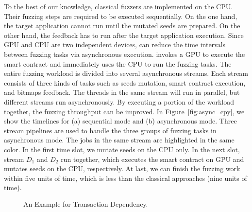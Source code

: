 To the best of our knowledge, classical fuzzers are implemented on the CPU. 
Their fuzzing steps are required to be executed sequentially.
On the one hand, the target application cannot run until the mutated seeds are prepared. 
On the other hand, the feedback has to run after the target application execution. 
%
Since GPU and CPU are two independent devices, {\runner} can reduce the time intervals between fuzzing tasks via asynchronous execution.
{\runner} invokes a GPU to execute the smart contract and immediately uses the CPU to run the fuzzing tasks.
%
The entire fuzzing workload is divided into several asynchronous streams.
Each stream consists of three kinds of tasks such as seeds mutation, smart contract execution, and bitmaps feedback. 
The threads in the same stream will run in parallel, but different streams run asynchronously. 
By executing a portion of the workload together, the fuzzing throughput can be improved. 
%
In Figure~\ref{fig:async_cpy}, we show the timelines for (a) sequential mode and (b) asynchronous mode. 
Three stream pipelines are used to handle the three groups of fuzzing tasks in asynchronous mode. 
The jobs in the same stream are highlighted in the same color. 
In the first time slot, we mutate seeds on the CPU only. 
In the next slot, stream $D_1$ and $D_2$ run together, which executes the smart contract on GPU and mutates seeds on the CPU, respectively. 
%
At last, we can finish the fuzzing work within five units of time, which is less than the classical approaches (nine units of time).
%

%

\begin{figure}[ht]
    \centering
    
    \vspace{-0.1in}
    \caption{An Example for Transaction Dependency.}
    \label{fig:code_tx_dep}
\end{figure}


